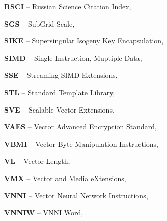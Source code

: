 \textbf{RSCI} -- Russian Science Citation Index, \pageref{abbr:rsci-1}

\textbf{SGS} -- SubGrid Scale, \pageref{abbr:sgs-1}

\textbf{SIKE} -- Supersingular Isogeny Key Encapsulation, \pageref{abbr:sike-1}

\textbf{SIMD} -- Single Instruction, Muptiple Data, \pageref{abbr:simd-1}

\textbf{SSE} -- Streaming SIMD Extensions, \pageref{abbr:sse-1}

\textbf{STL} -- Standard Template Library, \pageref{abbr:stl-1}

\textbf{SVE} -- Scalable Vector Extensions, \pageref{abbr:sve-1}

\textbf{VAES} -- Vector Advanced Encryption Standard, \pageref{abbr:vaes-1}

\textbf{VBMI} -- Vector Byte Manipulation Instructions, \pageref{abbr:vbmi-1}

\textbf{VL} -- Vector Length, \pageref{abbr:vl-1}

\textbf{VMX} -- Vector and Media eXtensions, \pageref{abbr:vmx-1}

\textbf{VNNI} -- Vector Neural Network Instructions, \pageref{abbr:vnni-1}

\textbf{VNNIW} -- VNNI Word, \pageref{abbr:vnniw-1}
